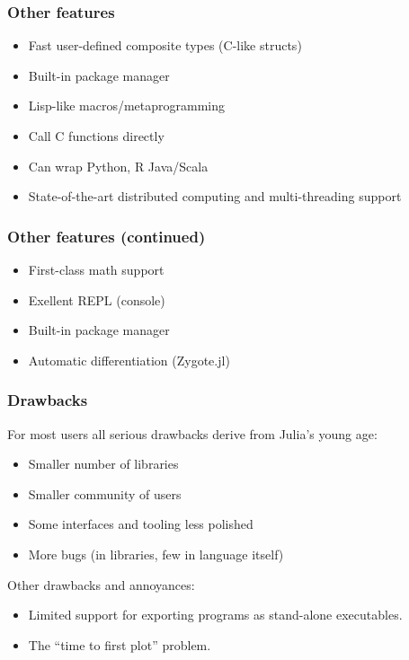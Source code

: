 \documentclass[t]{beamer}
\begin{document}
\begin{frame}
  \frametitle{Other features}
  \begin{itemize}
    \item Fast user-defined composite types (C-like structs)
    \item Built-in package manager
    \item Lisp-like macros/metaprogramming
    \item Call C functions directly
    \item Can wrap Python, R Java/Scala
    \item State-of-the-art distributed computing and multi-threading support
  \end{itemize}
\end{frame}

\begin{frame}
  \frametitle{Other features (continued)}
  \begin{itemize}
  \item First-class math support
    \item Exellent REPL (console)
    \item Built-in package manager
    \item Automatic differentiation (Zygote.jl)
  \end{itemize}
\end{frame}

\begin{frame}
  \frametitle{Drawbacks}
  For most users all serious drawbacks derive from Julia's young age:
  \begin{itemize}
     \item Smaller number of libraries
     \item Smaller community of users
     \item Some interfaces and tooling less polished
     \item More bugs (in libraries, few in language itself)
  \end{itemize}
  Other drawbacks and annoyances:
  \begin{itemize}
     \item Limited support for exporting programs as stand-alone executables.
     \item The ``time to first plot'' problem. 
  \end{itemize}
\end{frame}
\end{document}
